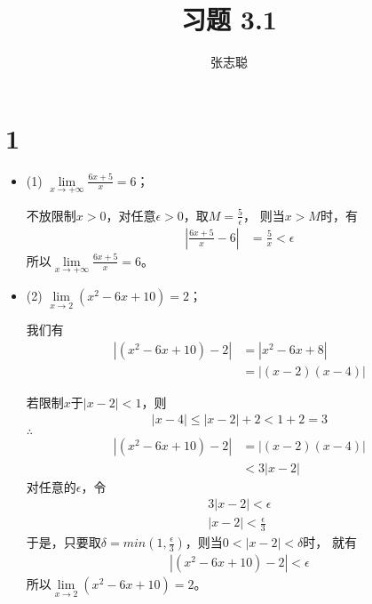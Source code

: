 \documentclass{article}
\begin{document}
\title{习题 3.1}
\author{张志聪}
\maketitle

\section*{1}

\begin{itemize}
  \item (1) $\lim\limits_{x \to +\infty} \frac{6x + 5}{x} = 6$；

        不放限制$x > 0$，对任意$\epsilon > 0$，取$M = \frac{5}{\epsilon}$，
        则当$x > M$时，有
        \begin{align*}
          |\frac{6x + 5}{x} - 6| & = \frac{5}{x} < \epsilon
        \end{align*}
        所以$\lim\limits_{x \to +\infty} \frac{6x + 5}{x} = 6$。

  \item (2) $\lim\limits_{x \to 2} (x^2 - 6x + 10) = 2$；

        我们有
        \begin{align*}
          |(x^2 - 6x + 10) - 2|
           & = |x^2 - 6x + 8|   \\
           & = |(x - 2)(x - 4)|
        \end{align*}

        若限制$x$于$|x - 2| < 1$，则
        \begin{align*}
          |x - 4| \leq |x - 2| + 2 < 1 + 2 = 3
        \end{align*}
        $\therefore$
        \begin{align*}
          |(x^2 - 6x + 10) - 2| & = |(x - 2)(x - 4)| \\
                                & < 3 |x - 2|
        \end{align*}
        对任意的$\epsilon$，令
        \begin{align*}
          3 |x - 2| < \epsilon \\
          |x - 2| < \frac{\epsilon}{3}
        \end{align*}
        于是，只要取$\delta = min(1, \frac{\epsilon}{3})$，则当$0 < |x - 2| < \delta$时，
        就有
        \begin{align*}
          |(x^2 - 6x + 10) - 2| < \epsilon
        \end{align*}
        所以$\lim\limits_{x \to 2} (x^2 - 6x + 10) = 2$。


\end{itemize}
\end{document}
